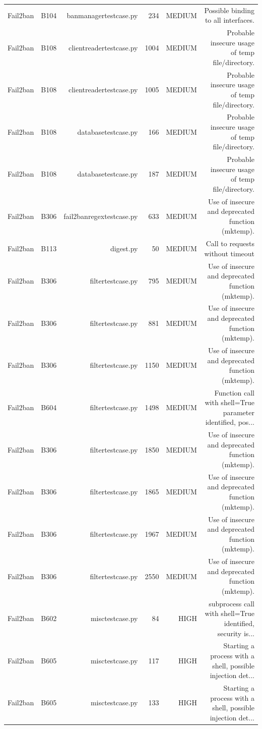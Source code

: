 \begin{table}[htbp]
\begin{tabular}{lrrrrr}
Fail2ban & B104 & banmanagertestcase.py & 234 & MEDIUM & Possible binding to all interfaces. \\
Fail2ban & B108 & clientreadertestcase.py & 1004 & MEDIUM & Probable insecure usage of temp file/directory. \\
Fail2ban & B108 & clientreadertestcase.py & 1005 & MEDIUM & Probable insecure usage of temp file/directory. \\
Fail2ban & B108 & databasetestcase.py & 166 & MEDIUM & Probable insecure usage of temp file/directory. \\
Fail2ban & B108 & databasetestcase.py & 187 & MEDIUM & Probable insecure usage of temp file/directory. \\
Fail2ban & B306 & fail2banregextestcase.py & 633 & MEDIUM & Use of insecure and deprecated function (mktemp). \\
Fail2ban & B113 & digest.py & 50 & MEDIUM & Call to requests without timeout \\
Fail2ban & B306 & filtertestcase.py & 795 & MEDIUM & Use of insecure and deprecated function (mktemp). \\
Fail2ban & B306 & filtertestcase.py & 881 & MEDIUM & Use of insecure and deprecated function (mktemp). \\
Fail2ban & B306 & filtertestcase.py & 1150 & MEDIUM & Use of insecure and deprecated function (mktemp). \\
Fail2ban & B604 & filtertestcase.py & 1498 & MEDIUM & Function call with shell=True parameter identified, pos... \\
Fail2ban & B306 & filtertestcase.py & 1850 & MEDIUM & Use of insecure and deprecated function (mktemp). \\
Fail2ban & B306 & filtertestcase.py & 1865 & MEDIUM & Use of insecure and deprecated function (mktemp). \\
Fail2ban & B306 & filtertestcase.py & 1967 & MEDIUM & Use of insecure and deprecated function (mktemp). \\
Fail2ban & B306 & filtertestcase.py & 2550 & MEDIUM & Use of insecure and deprecated function (mktemp). \\
Fail2ban & B602 & misctestcase.py & 84 & HIGH & subprocess call with shell=True identified, security is... \\
Fail2ban & B605 & misctestcase.py & 117 & HIGH & Starting a process with a shell, possible injection det... \\
Fail2ban & B605 & misctestcase.py & 133 & HIGH & Starting a process with a shell, possible injection det... \\

\end{tabular}
\end{table}
